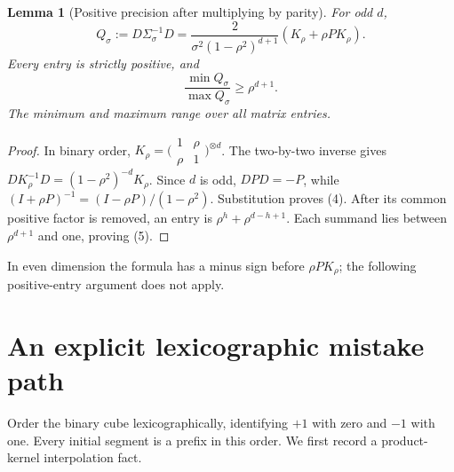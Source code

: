 \documentclass[11pt]{article}
\newtheorem{lemma}[theorem]{Lemma}
\begin{document}
\begin{lemma}[Positive precision after multiplying by parity]
For odd $d$,
\[
 Q_\sigma:=D\Sigma_\sigma^{-1}D
   =\frac{2}{\sigma^2(1-\rho^2)^{d+1}}
                          (K_\rho+\rho P K_\rho).        \tag{4}
\]
Every entry is strictly positive, and
\[
             \frac{\min Q_\sigma}{\max Q_\sigma}\ge\rho^{d+1}.   \tag{5}
\]
The minimum and maximum range over all matrix entries.
\end{lemma}
\begin{proof}
In binary order,
$K_\rho=\bigl(\begin{smallmatrix}1&\rho\\\rho&1\end{smallmatrix}\bigr)^{\otimes d}$.
The two-by-two inverse gives
$DK_\rho^{-1}D=(1-\rho^2)^{-d}K_\rho$.
Since $d$ is odd, $DPD=-P$, while
$(I+\rho P)^{-1}=(I-\rho P)/(1-\rho^2)$.
Substitution proves (4). After its common positive factor is removed,
an entry is $\rho^h+\rho^{d-h+1}$. Each summand lies between
$\rho^{d+1}$ and one, proving (5).
\end{proof}
In even dimension the formula has a minus sign before $\rho P K_\rho$;
the following positive-entry argument does not apply.

\section{An explicit lexicographic mistake path}
Order the binary cube lexicographically, identifying $+1$ with zero
and $-1$ with one. Every initial segment is a prefix in this order.
We first record a product-kernel interpolation fact.
\end{document}
